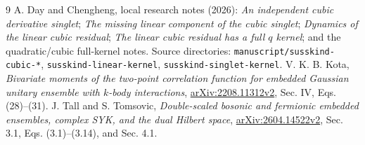 \documentclass[11pt,a4paper]{article}
\begin{document}
\begin{thebibliography}{9}
 A. Day and Chengheng, local research notes (2026):
\emph{An independent cubic derivative singlet};
\emph{The missing linear component of the cubic singlet};
\emph{Dynamics of the linear cubic residual};
\emph{The linear cubic residual has a full $q$ kernel};
and the quadratic/cubic full-kernel notes. Source directories:
\texttt{manuscript/susskind-cubic-*},
\texttt{susskind-linear-kernel}, \texttt{susskind-singlet-kernel}.
 V. K. B. Kota,
\emph{Bivariate moments of the two-point correlation function for
embedded Gaussian unitary ensemble with $k$-body interactions},
\href{https://arxiv.org/html/2208.11312}{arXiv:2208.11312v2},
Sec. IV, Eqs. (28)--(31).
 J. Tall and S. Tomsovic,
\emph{Double-scaled bosonic and fermionic embedded ensembles,
complex SYK, and the dual Hilbert space},
\href{https://arxiv.org/html/2604.14522v2}{arXiv:2604.14522v2},
Sec. 3.1, Eqs. (3.1)--(3.14), and Sec. 4.1.
\end{thebibliography}
\end{document}
